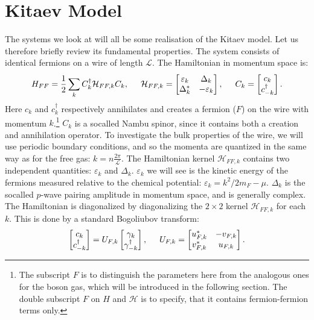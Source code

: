 \section{Kitaev Model}
\label{sec.KitaevModel}
The systems we look at will all be some realisation of the Kitaev model. Let us therefore briefly review its fundamental properties. The system consists of identical fermions on a wire of length $\mathcal{L}$. The Hamiltonian in momentum space is: 
\begin{equation}
H_{FF} = \frac{1}{2}\sum_{k} C^\dagger_k \mathcal{H}_{FF,k} C_k, \hspace{0.5cm} \mathcal{H}_{FF,k} = \begin{bmatrix} \varepsilon_k & \Delta_k \\ \Delta^*_k & -\varepsilon_k \end{bmatrix}, \hspace{0.5cm} C_k = \begin{bmatrix} c_k \\ c^\dagger_{-k} \end{bmatrix}. 
\label{eq.HKitaevpre}
\end{equation}
Here $c_k$ and $c_k^\dagger$ respectively annihilates and creates a fermion ($F$) on the wire with momentum $k$.\footnote{The subscript $F$ is to distinguish the parameters here from the analogous ones for the boson gas, which will be introduced in the following section. The double subscript $F$ on $H$ and $\mathcal{H}$ is to specify, that it contains fermion-fermion terms only.} $C_k$ is a socalled Nambu spinor, since it contains both a creation and annihilation operator. To investigate the bulk properties of the wire, we will use periodic boundary conditions, and so the momenta are quantized in the same way as for the free gas: $k = n\frac{2\pi}{\mathcal{L}}$. The Hamiltonian kernel $\mathcal{H}_{FF,k}$ contains two independent quantities: $\varepsilon_k$ and $\Delta_k$. $\varepsilon_k$ we will see is the kinetic energy of the fermions measured relative to the chemical potential: $\varepsilon_k = k^2/2m_F-\mu$. $\Delta_k$ is the socalled $p$-wave pairing amplitude in momentum space, and is generally complex. The Hamiltonian is diagonalized by diagonalizing the $2\times 2$ kernel $\mathcal{H}_{FF,k}$ for each $k$. This is done by a standard Bogoliubov transform: 
\begin{equation}
 \begin{bmatrix} c_k \\ c_{-k}^\dagger \end{bmatrix} = U_{F,k} \begin{bmatrix} \gamma_k \\ \gamma^\dagger_{-k} \end{bmatrix}, \hspace{0.5cm} U_{F,k} = \begin{bmatrix} u^*_{F,k} & -v_{F,k} \\ v^*_{F,k} & u_{F,k} \end{bmatrix}. 
 \label{eq.fermionquasiparticledef}
\end{equation}
